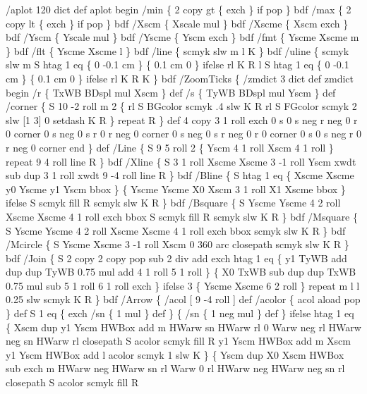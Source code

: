 \documentclass[11pt]{article}
\begin{document}
\nwenddocs{}\endmoddef
%
/aplot 120 dict def aplot begin
/min \{ 2 copy gt \{ exch \} if pop \} bdf 
/max \{ 2 copy lt \{ exch \} if pop \} bdf
/Xscm \{ Xscale mul \} bdf /Xscme \{ Xscm exch \} bdf
/Yscm \{ Yscale mul \} bdf /Yscme \{ Yscm exch \} bdf
/fmt \{ Yscme Xscme m \} bdf /flt \{ Yscme Xscme l \} bdf
/line \{ scmyk slw m l K \} bdf
/uline \{
  scmyk slw m S htag 1 eq \{ 0 -0.1 cm \} \{ 0.1 cm 0 \} ifelse
  rl K R l S htag 1 eq \{ 0 -0.1 cm \} \{ 0.1 cm 0 \} ifelse
  rl K R K
  \} bdf
/ZoomTicks \{
  /zmdict 3 dict def zmdict begin
  /r \{ TxWB BDspl mul Xscm \} def /s \{ TyWB BDspl mul Yscm \} def
  /corner \{ S 10 -2 roll m 
    2 \{ rl S BGcolor scmyk .4 slw K R rl
      S FGcolor scmyk 2 slw [1 3] 0 setdash K R
      \} repeat R 
    \} def
  4 copy 3 1 roll exch
  0 s 0 s neg r neg 0 r 0 corner
  0 s neg 0 s r 0 r neg 0 corner
  0 s neg 0 s r neg 0 r 0 corner
  0 s 0 s neg r 0 r neg 0 corner end
  \} def
/Line \{
  S 9 5 roll 
    2 \{ Yscm 4 1 roll Xscm 4 1 roll \} repeat
    9 4 roll line
  R \} bdf
/Xline \{ 
  S 3 1 roll Xscme Xscme 3 -1 roll Yscm xwdt sub dup
    3 1 roll xwdt 9 -4 roll line
  R \} bdf
/Bline \{
  S htag 1 eq \{ Xscme Xscme y0 Yscme y1 Yscm bbox \}
     \{ Yscme Yscme X0 Xscm 3 1 roll X1 Xscme bbox \} ifelse
  S scmyk fill 
  R scmyk slw K
  R \} bdf
/Bsquare \{
  S Yscme Yscme 4 2 roll Xscme Xscme 4 1 roll exch bbox 
  S scmyk fill 
  R scmyk slw K
  R \} bdf
/Msquare \{
  S Yscme Yscme 4 2 roll Xscme Xscme 4 1 roll exch bbox
    scmyk slw K
  R \} bdf
/Mcircle \{
  S Yscme Xscme 3 -1 roll Xscm 0 360 arc closepath scmyk slw K
  R \} bdf
/Join \{
  S 2 copy 2 copy pop sub 2 div add exch
    htag 1 eq \{
      y1 TyWB add dup dup TyWB 0.75 mul add 4 1 roll 5 1 roll
      \} \{
        X0 TxWB sub dup dup TxWB 0.75 mul sub 5 1 roll 6 1 roll exch
      \} ifelse
    3 \{ Yscme Xscme 6 2 roll \} repeat
    m l l 0.25 slw scmyk K
  R \} bdf
/Arrow \{
  /acol [ 9 -4 roll ] def /acolor \{ acol aload pop \} def
  S 1 eq \{ exch /sn \{ 1 mul \} def \} \{ /sn \{ 1 neg mul \} def \} ifelse
    htag 1 eq \{ Xscm dup y1 Yscm HWBox add m
      HWarw sn HWarw rl 0 Warw neg rl HWarw neg sn HWarw rl closepath
      S acolor scmyk fill R
      y1 Yscm HWBox add m Xscm y1 Yscm HWBox add l acolor scmyk 1 slw K
      \} \{ Yscm dup X0 Xscm HWBox sub exch m
        HWarw neg HWarw sn rl Warw 0 rl HWarw neg HWarw neg sn rl closepath
        S acolor scmyk fill R
\end{document}
